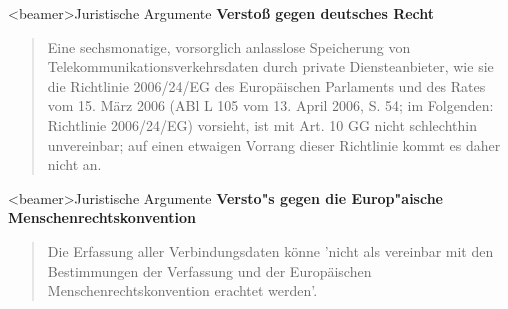     \begin{frame}<beamer>{Juristische Argumente}
      \textbf{Verstoß gegen deutsches Recht}
      \begin{quote}
        Eine sechsmonatige, vorsorglich anlasslose Speicherung von Telekommunikationsverkehrsdaten durch private Diensteanbieter, wie sie die Richtlinie 2006/24/EG des Europäischen Parlaments und des Rates vom 15. März 2006 (ABl L 105 vom 13. April 2006, S. 54; im Folgenden: Richtlinie 2006/24/EG) vorsieht, ist mit Art. 10 GG nicht schlechthin unvereinbar; auf einen etwaigen Vorrang dieser Richtlinie kommt es daher nicht an.

      \end{quote}
    \end{frame}

    \begin{frame}<beamer>{Juristische Argumente}
      \textbf{Versto"s gegen die Europ"aische Menschenrechtskonvention}
      \begin{quote}
        Die Erfassung aller Verbindungsdaten könne 'nicht als vereinbar mit den Bestimmungen der Verfassung und der Europäischen Menschenrechtskonvention erachtet werden'.

      \end{quote}
    \end{frame}


